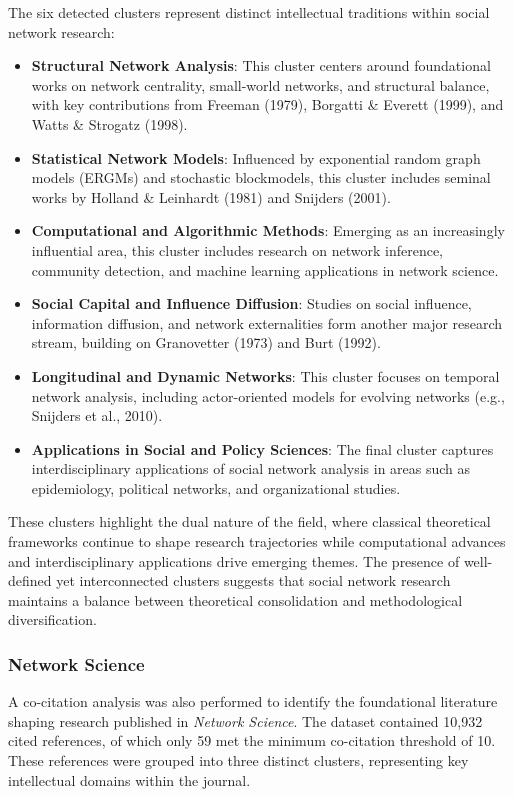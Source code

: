 \documentclass[twocolumn]{article}
\begin{document}
	The six detected clusters represent distinct intellectual traditions within social network research:
	
	\begin{itemize}
		\item \textbf{Structural Network Analysis}: This cluster centers around foundational works on network centrality, small-world networks, and structural balance, with key contributions from Freeman (1979), Borgatti \& Everett (1999), and Watts \& Strogatz (1998).
		\item \textbf{Statistical Network Models}: Influenced by exponential random graph models (ERGMs) and stochastic blockmodels, this cluster includes seminal works by Holland \& Leinhardt (1981) and Snijders (2001).
		\item \textbf{Computational and Algorithmic Methods}: Emerging as an increasingly influential area, this cluster includes research on network inference, community detection, and machine learning applications in network science.
		\item \textbf{Social Capital and Influence Diffusion}: Studies on social influence, information diffusion, and network externalities form another major research stream, building on Granovetter (1973) and Burt (1992).
		\item \textbf{Longitudinal and Dynamic Networks}: This cluster focuses on temporal network analysis, including actor-oriented models for evolving networks (e.g., Snijders et al., 2010).
		\item \textbf{Applications in Social and Policy Sciences}: The final cluster captures interdisciplinary applications of social network analysis in areas such as epidemiology, political networks, and organizational studies.
	\end{itemize}
	
	These clusters highlight the dual nature of the field, where classical theoretical frameworks continue to shape research trajectories while computational advances and interdisciplinary applications drive emerging themes. The presence of well-defined yet interconnected clusters suggests that social network research maintains a balance between theoretical consolidation and methodological diversification.
	
	\subsubsection*{Network Science}
		
		A co-citation analysis was also performed to identify the foundational literature shaping research published in \textit{Network Science}. The dataset contained 10,932 cited references, of which only 59 met the minimum co-citation threshold of 10. These references were grouped into three distinct clusters, representing key intellectual domains within the journal.
		
\end{document}
